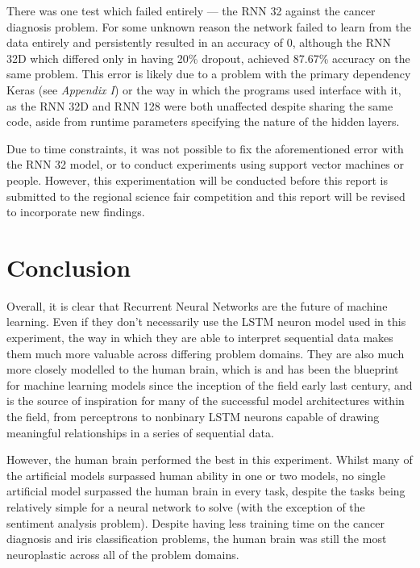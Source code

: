 \documentclass[]{report}
\begin{document}
There was one test which failed entirely --- the RNN 32 against the cancer diagnosis problem. For some unknown reason the network failed to learn from the data entirely and persistently resulted in an accuracy of 0, although the RNN 32D which differed only in having 20\% dropout, achieved 87.67\% accuracy on the same problem. This error is likely due to a problem with the primary dependency Keras (see \textit{Appendix I}) or the way in which the programs used interface with it, as the RNN 32D and RNN 128 were both unaffected despite sharing the same code, aside from runtime parameters specifying the nature of the hidden layers.

Due to time constraints, it was not possible to fix the aforementioned error with the RNN 32 model, or to conduct experiments using support vector machines or people. However, this experimentation will be conducted before this report is submitted to the regional science fair competition and this report will be revised to incorporate new findings.


\section{Conclusion}

Overall, it is clear that Recurrent Neural Networks are the future of machine learning. Even if they don't necessarily use the LSTM neuron model used in this experiment, the way in which they are able to interpret sequential data makes them much more valuable across differing problem domains. They are also much more closely modelled to the human brain, which is and has been the blueprint for machine learning models since the inception of the field early last century, and is the source of inspiration for many of the successful model architectures within the field, from perceptrons to nonbinary LSTM neurons capable of drawing meaningful relationships in a series of sequential data.

However, the human brain performed the best in this experiment. Whilst many of the artificial models surpassed human ability in one or two models, no single artificial model surpassed the human brain in every task, despite the tasks being relatively simple for a neural network to solve (with the exception of the sentiment analysis problem). Despite having less training time on the cancer diagnosis and iris classification problems, the human brain was still the most neuroplastic across all of the problem domains.
\end{document}
